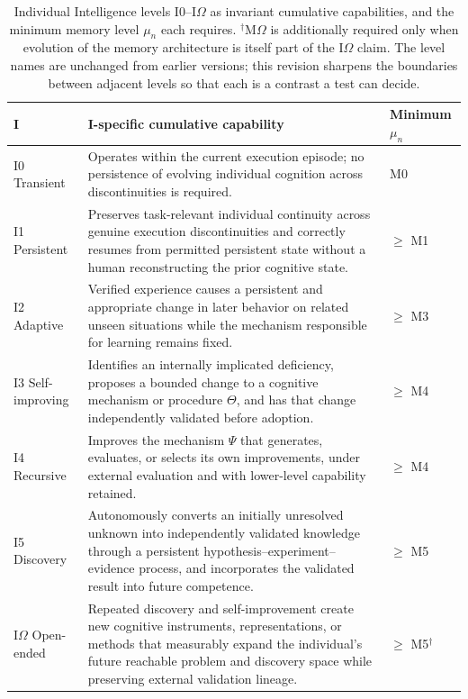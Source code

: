 \documentclass[11pt]{article}
\theoremstyle{definition}
\newcommand{\Om}{\ensuremath{\Omega}}
\begin{document}
\begin{table}[!htbp]
\centering\small
\begin{tabularx}{\textwidth}{@{}lY>{\raggedright\arraybackslash}p{2.1cm}@{}}
\toprule
I & I-specific cumulative capability & Minimum $\mu_n$ \\
\midrule
I0 Transient & Operates within the current execution episode; no persistence of evolving individual cognition across discontinuities is required. & M0 \\
I1 Persistent & Preserves task-relevant individual continuity across genuine execution discontinuities and correctly resumes from permitted persistent state without a human reconstructing the prior cognitive state. & $\ge$ M1 \\
I2 Adaptive & Verified experience causes a persistent and appropriate change in later behavior on related unseen situations while the mechanism responsible for learning remains fixed. & $\ge$ M3 \\
I3 Self-improving & Identifies an internally implicated deficiency, proposes a bounded change to a cognitive mechanism or procedure $\Theta$, and has that change independently validated before adoption. & $\ge$ M4 \\
I4 Recursive & Improves the mechanism $\Psi$ that generates, evaluates, or selects its own improvements, under external evaluation and with lower-level capability retained. & $\ge$ M4 \\
I5 Discovery & Autonomously converts an initially unresolved unknown into independently validated knowledge through a persistent hypothesis--experiment--evidence process, and incorporates the validated result into future competence. & $\ge$ M5 \\
I\Om{} Open-ended & Repeated discovery and self-improvement create new cognitive instruments, representations, or methods that measurably expand the individual's future reachable problem and discovery space while preserving external validation lineage. & $\ge$ M5$^{\dagger}$ \\
\bottomrule
\end{tabularx}
\caption{Individual Intelligence levels I0--I\Om{} as invariant cumulative capabilities, and the minimum memory level $\mu_n$ each requires. $^{\dagger}$M\Om{} is additionally required only when evolution of the memory architecture is itself part of the I\Om{} claim. The level names are unchanged from earlier versions; this revision sharpens the boundaries between adjacent levels so that each is a contrast a test can decide.}
\label{tab:i}
\end{table}
\end{document}
